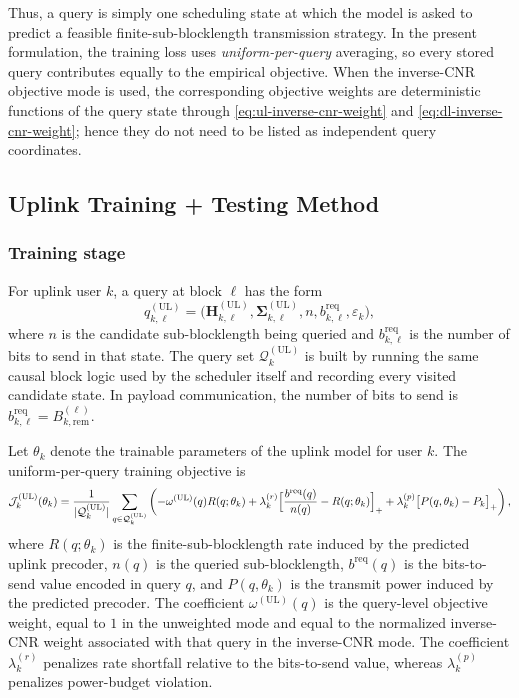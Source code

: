 \documentclass[11pt]{article}
\newcommand{\Qset}{\mathcal{Q}}
\newcommand{\Hc}{\mathbf{H}}
\newcommand{\Sig}{\mathbf{\Sigma}}
\newcommand{\UL}{\mathrm{UL}}
\begin{document}
Thus, a query is simply one scheduling state at which the model is asked to
predict a feasible finite-sub-blocklength transmission strategy. In the present
formulation, the training loss uses \emph{uniform-per-query} averaging, so every
stored query contributes equally to the empirical objective. When the
inverse-CNR objective mode is used, the corresponding objective weights are
deterministic functions of the query state through
\eqref{eq:ul-inverse-cnr-weight} and \eqref{eq:dl-inverse-cnr-weight}; hence
they do not need to be listed as independent query coordinates.

\subsection{Uplink Training + Testing Method}

\subsubsection{Training stage}

For uplink user $k$, a query at block $\ell$ has the form
\begin{equation}
q_{k,\ell}^{(\UL)}
=
\bigl(
\Hc_{k,\ell}^{(\UL)},
\Sig_{k,\ell}^{(\UL)},
n,
b_{k,\ell}^{\mathrm{req}},
\varepsilon_k
\bigr),
\label{eq:ul-query}
\end{equation}
where $n$ is the candidate sub-blocklength being queried and
$b_{k,\ell}^{\mathrm{req}}$ is the number of bits to send in that state. The
query set $\Qset_k^{(\UL)}$ is built by running the same causal block logic
used by the scheduler itself and recording every visited candidate state. In
payload communication, the number of bits to send is
$b_{k,\ell}^{\mathrm{req}} = B_{k,\mathrm{rem}}^{(\ell)}$.

Let $\theta_k$ denote the trainable parameters of the uplink model for user $k$.
The uniform-per-query training objective is
\begin{equation}
\mathcal{J}_k^{(\UL)}(\theta_k)
=
\frac{1}{\lvert\Qset_k^{(\UL)}\rvert}
\sum_{q\in\Qset_k^{(\UL)}}
\left(
-\omega^{(\UL)}(q)R(q;\theta_k)
+
\lambda_k^{(r)}\Bigl[\frac{b^{\mathrm{req}}(q)}{n(q)}-R(q;\theta_k)\Bigr]_+
+
\lambda_k^{(p)}\bigl[P(q,\theta_k)-P_k\bigr]_+
\right),
\label{eq:ul-training-objective}
\end{equation}
where $R(q;\theta_k)$ is the finite-sub-blocklength rate induced by the predicted
uplink precoder, $n(q)$ is the queried sub-blocklength, $b^{\mathrm{req}}(q)$ is
the bits-to-send value encoded in query $q$, and $P(q,\theta_k)$ is the
transmit power induced by the predicted precoder. The coefficient
$\omega^{(\UL)}(q)$ is the query-level objective weight, equal to $1$ in the
unweighted mode and equal to the normalized inverse-CNR weight associated with
that query in the inverse-CNR mode. The coefficient $\lambda_k^{(r)}$
penalizes rate shortfall relative to the bits-to-send value, whereas
$\lambda_k^{(p)}$ penalizes power-budget violation.
\end{document}

